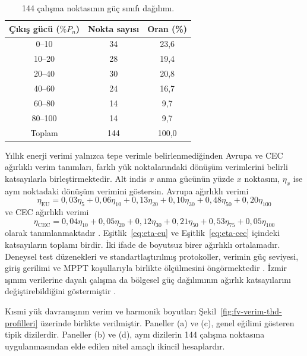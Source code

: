 \begin{table}[H]
  \centering
  \caption{144 çalışma noktasının güç sınıfı dağılımı.}
  \label{tab:fv-guc-dagilimi}
  \begin{tabular}{ccc}
    \toprule
    \textbf{Çıkış gücü ($\%P_n$)} & \textbf{Nokta sayısı} & \textbf{Oran (\%)} \\
    \midrule
    0--10 & 34 & 23,6 \\
    10--20 & 28 & 19,4 \\
    20--40 & 30 & 20,8 \\
    40--60 & 24 & 16,7 \\
    60--80 & 14 & 9,7 \\
    80--100 & 14 & 9,7 \\
    \midrule
    Toplam & 144 & 100,0 \\
    \bottomrule
  \end{tabular}
\end{table}

Yıllık enerji verimi yalnızca tepe verimle belirlenmediğinden Avrupa ve CEC ağırlıklı verim tanımları, farklı yük noktalarındaki dönüşüm verimlerini belirli katsayılarla birleştirmektedir. Alt indis $x$ anma gücünün yüzde $x$ noktasını, $\eta_x$ ise aynı noktadaki dönüşüm verimini göstersin. Avrupa ağırlıklı verimi
\begin{equation}
\eta_{\mathrm{EU}}=0{,}03\eta_{5}+0{,}06\eta_{10}+0{,}13\eta_{20}+0{,}10\eta_{30}+0{,}48\eta_{50}+0{,}20\eta_{100}
\label{eq:eta-eu}
\end{equation}
ve CEC ağırlıklı verimi
\begin{equation}
\eta_{\mathrm{CEC}}=0{,}04\eta_{10}+0{,}05\eta_{20}+0{,}12\eta_{30}+0{,}21\eta_{50}+0{,}53\eta_{75}+0{,}05\eta_{100}
\label{eq:eta-cec}
\end{equation}
olarak tanımlanmaktadır \citep{Sera2008,Sandia2015}. Eşitlik~\eqref{eq:eta-eu} ve Eşitlik~\eqref{eq:eta-cec} içindeki katsayıların toplamı birdir. İki ifade de boyutsuz birer ağırlıklı ortalamadır. Deneysel test düzenekleri ve standartlaştırılmış protokoller, verimin güç seviyesi, giriş gerilimi ve MPPT koşullarıyla birlikte ölçülmesini öngörmektedir \citep{Sera2008,Sandia2015}. İzmir ışınım verilerine dayalı çalışma da bölgesel güç dağılımının ağırlık katsayılarını değiştirebildiğini göstermiştir \citep{Ongun2013}.

Kısmi yük davranışının verim ve harmonik boyutları Şekil~\ref{fig:fv-verim-thd-profilleri} üzerinde birlikte verilmiştir. Paneller (a) ve (c), genel eğilimi gösteren tipik dizilerdir. Paneller (b) ve (d), aynı dizilerin 144 çalışma noktasına uygulanmasından elde edilen nitel amaçlı ikincil hesaplardır.

